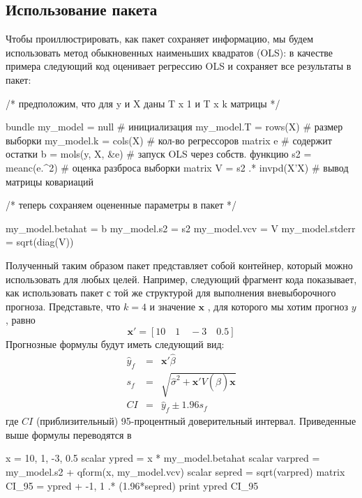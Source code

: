 \subsection{Использование пакета}
\label{sec:bundle-usage}

Чтобы проиллюстрировать, как пакет сохраняет информацию, мы будем
использовать метод обыкновенных наименьших квадратов (OLS): в качестве
примера следующий код оценивает регрессию OLS и сохраняет все
результаты в пакет:

\begin{code}
/* предположим, что для y и X даны T x 1 и T x k матрицы */

bundle my_model = null               # инициализация
my_model.T = rows(X)                 # размер выборки
my_model.k = cols(X)                 # кол-во регрессоров
matrix e                             # содержит остатки
b = mols(y, X, &e)                   # запуск OLS через собств. функцию
s2 = meanc(e.^2)                     # оценка разброса выборки
matrix V = s2 .* invpd(X'X)          # вывод матрицы ковариаций

/* теперь сохраняем оцененные параметры в пакет */

my_model.betahat = b
my_model.s2 = s2
my_model.vcv = V
my_model.stderr = sqrt(diag(V))
\end{code}

Полученный таким образом пакет представляет собой контейнер, который
можно использовать для любых целей. Например, следующий фрагмент кода
показывает, как использовать пакет с той же структурой для выполнения
вневыборочного прогноза. Представьте, что $k=4$ и значение
$\mathbf{x}$ , для которого мы хотим прогноз $y$ , равно
\[
  \mathbf{x}' = [ 10 \quad 1  \quad -3 \quad 0.5 ]
\]
Прогнозные формулы будут иметь следующий вид:
\begin{eqnarray*}
  \hat{y}_f & = & \mathbf{x}'\hat{\beta} \\
  s_f & = & \sqrt{\hat{\sigma}^2 + \mathbf{x}'V(\hat{\beta})\mathbf{x}} \\
  CI & = & \hat{y}_f \pm 1.96 s_f 
\end{eqnarray*}
где $CI$ (приблизительный) 95-процентный доверительный
интервал. Приведенные выше формулы переводятся в
\begin{code}
  x = { 10, 1, -3, 0.5 }
  scalar ypred    = x * my_model.betahat
  scalar varpred  = my_model.s2 + qform(x, my_model.vcv)
  scalar sepred   = sqrt(varpred)
  matrix CI_95    = ypred + {-1, 1} .* (1.96*sepred)
  print ypred CI_95
\end{code}


